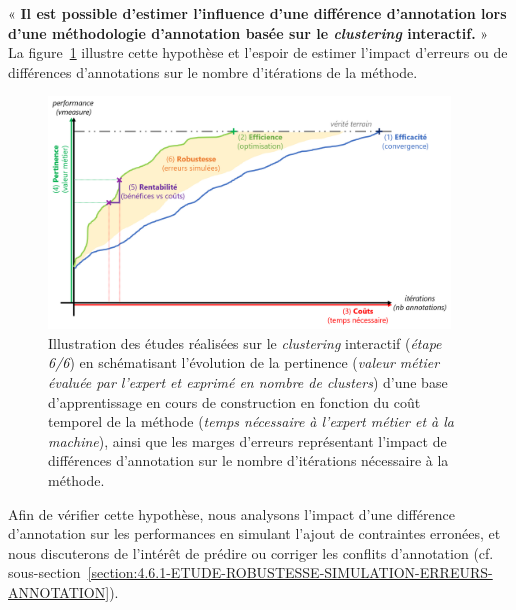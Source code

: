 	\begin{tcolorbox}[
		title=\faVial~\textbf{Hypothèse de robustesse}~\faVial,
		colback=colorTcolorboxHypothesis!15,
		colframe=colorTcolorboxHypothesis!75,
		width=\linewidth
	]
		« \textbf{
			Il est possible d'\textbf{estimer l'influence d'une différence d'annotation} lors d'une méthodologie d'annotation basée sur le \textit{clustering} interactif.
		} » \\
		
		La figure~\ref{figure:4.6-HYPOTHESE-ROBUSTESSE} illustre cette hypothèse et l'espoir de estimer l'impact d'erreurs ou de différences d'annotations sur le nombre d'itérations de la méthode.
		\begin{figure}[H]  %
			\centering
			\includegraphics[width=0.95\textwidth]{figures/hypotheses-06-robustesse}
			\caption{Illustration des études réalisées sur le \textit{clustering} interactif (\textit{étape 6/6}) en schématisant l'évolution de la pertinence (\textit{valeur métier évaluée par l'expert et exprimé en nombre de clusters}) d'une base d'apprentissage en cours de construction en fonction du coût temporel de la méthode (\textit{temps nécessaire à l'expert métier et à la machine}), ainsi que les marges d'erreurs représentant l'impact de différences d'annotation sur le nombre d'itérations nécessaire à la méthode.}
			\label{figure:4.6-HYPOTHESE-ROBUSTESSE}
		\end{figure}

	\end{tcolorbox}
		
	Afin de vérifier cette hypothèse, nous analysons l'impact d'une différence d'annotation sur les performances en simulant l'ajout de contraintes erronées, et nous discuterons de l'intérêt de prédire ou corriger les conflits d'annotation (cf. sous-section~\ref{section:4.6.1-ETUDE-ROBUSTESSE-SIMULATION-ERREURS-ANNOTATION}).
	
